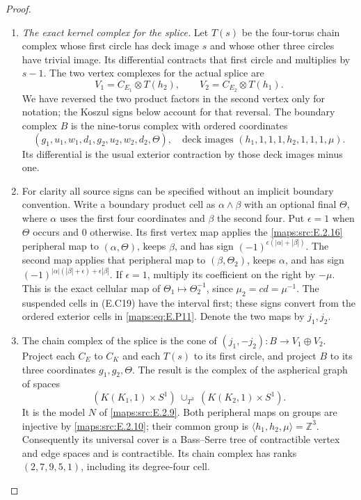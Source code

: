 \begin{proof}
\begin{enumerate}[label=\arabic*.,leftmargin=*]
\item \emph{The exact kernel complex for the splice.}
Let $T(s)$ be the four-torus chain complex whose
first circle has deck image $s$ and whose other
three circles have trivial image. Its differential
contracts that first circle and multiplies by $s-1$.
The two vertex complexes for the actual splice are
\[
 V_1=C_{E_1}\otimes T(h_2),\qquad
 V_2=C_{E_2}\otimes T(h_1).
 \tag{E.P10}\label{maps:eq:E.P10}
\]
We have reversed the two product factors in the
second vertex only for notation; the Koszul signs
below account for that reversal. The boundary
complex $B$ is the nine-torus complex with ordered
coordinates
\[
 (g_1,u_1,w_1,d_1,g_2,u_2,w_2,d_2,\Theta),
 \quad\text{deck images }(h_1,1,1,1,h_2,1,1,1,\mu).
 \tag{E.P11}\label{maps:eq:E.P11}
\]
Its differential is the usual exterior contraction
by those deck images minus one.

\item For clarity all source signs can be specified
without an implicit boundary convention. Write
a boundary product cell as $\alpha\wedge\beta$
with an optional final $\Theta$, where $\alpha$
uses the first four coordinates and $\beta$ the
second four. Put $\epsilon=1$ when $\Theta$ occurs
and $0$ otherwise. Its first vertex map applies
the \ref{maps:src:E.2.16} peripheral map to $(\alpha,\Theta)$,
keeps $\beta$, and has sign
$(-1)^{\epsilon(|\alpha|+|\beta|)}$.
The second map applies that peripheral map to
$(\beta,\Theta_2)$, keeps $\alpha$, and has sign
$(-1)^{|\alpha|(|\beta|+\epsilon)+\epsilon|\beta|}$.
If $\epsilon=1$, multiply its coefficient on the
right by $-\mu$. This is the exact cellular map
of $\Theta_1\mapsto\Theta_2^{-1}$, since
$\mu_2=cd=\mu^{-1}$. The suspended cells in (E.C19)
have the interval first; these signs convert from
the ordered exterior cells in \eqref{maps:eq:E.P11}.
Denote the two maps by $j_1,j_2$.

\item The chain complex of the splice is the cone of
$(j_1,-j_2):B\to V_1\oplus V_2$.
Project each $C_E$ to $C_K$ and each $T(s)$ to its
first circle, and project $B$ to its three coordinates
$g_1,g_2,\Theta$. The result is the complex of the
aspherical graph of spaces
\[
 (K(K_1,1)\times S^1)\ \cup_{T^3}\
                         (K(K_2,1)\times S^1).
 \tag{E.P12}\label{maps:eq:E.P12}
\]
It is the model $N$ of \ref{maps:src:E.2.9}. Both peripheral maps
on groups are injective by \ref{maps:src:E.2.10}; their common
group is $\langle h_1,h_2,\mu\rangle=\mathbb Z^3$.
Consequently its universal cover is a Bass--Serre
tree of contractible vertex and edge spaces and
is contractible. Its chain complex has ranks
$(2,7,9,5,1)$, including its degree-four cell.


\end{enumerate}
\end{proof}

